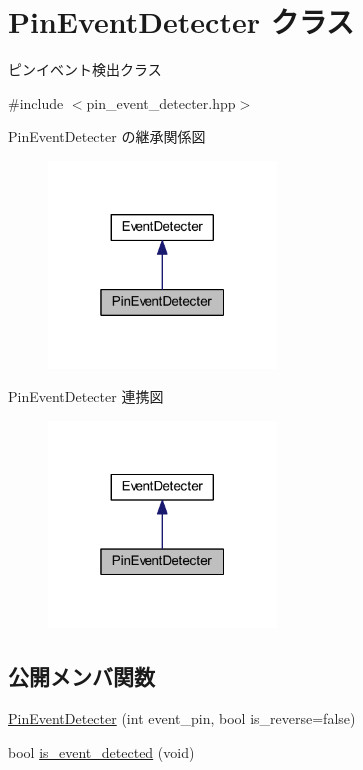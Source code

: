 \hypertarget{class_pin_event_detecter}{}\section{Pin\+Event\+Detecter クラス}
\label{class_pin_event_detecter}


ピンイベント検出クラス  




{\ttfamily \#include $<$pin\+\_\+event\+\_\+detecter.\+hpp$>$}



Pin\+Event\+Detecter の継承関係図
\nopagebreak
\begin{figure}[H]
\begin{center}
\leavevmode
\includegraphics[width=172pt]{class_pin_event_detecter__inherit__graph}
\end{center}
\end{figure}


Pin\+Event\+Detecter 連携図
\nopagebreak
\begin{figure}[H]
\begin{center}
\leavevmode
\includegraphics[width=172pt]{class_pin_event_detecter__coll__graph}
\end{center}
\end{figure}
\subsection*{公開メンバ関数}
\begin{DoxyCompactItemize}
\item 
\mbox{\hyperlink{class_pin_event_detecter_aa1d81fff7c1bdbbf0351466d2f5784d5}{Pin\+Event\+Detecter}} (int event\+\_\+pin, bool is\+\_\+reverse=false)
\item 
bool \mbox{\hyperlink{class_pin_event_detecter_a6e65a11e39838c30f58c66dd057abc90}{is\+\_\+event\+\_\+detected}} (void)
\end{DoxyCompactItemize}


